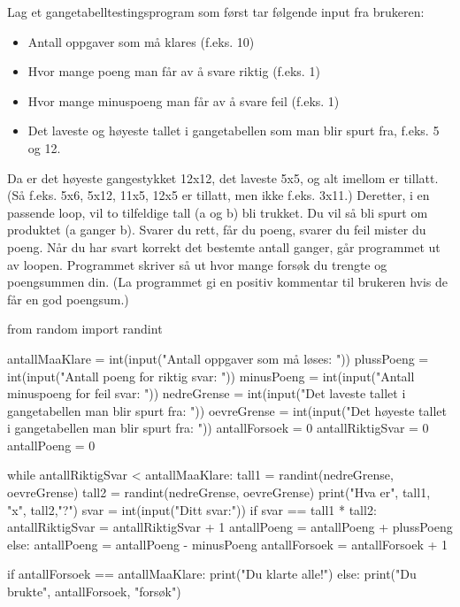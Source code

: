 \begin{exercise}
Lag et gangetabelltestingsprogram som først tar følgende input fra brukeren:
\begin{itemize}
\item Antall oppgaver som må klares (f.eks. 10)
\item Hvor mange poeng man får av å svare riktig (f.eks. 1)
\item Hvor mange minuspoeng man får av å svare feil (f.eks. 1)
\item Det laveste og høyeste tallet i gangetabellen som man blir spurt fra, f.eks. 5 og 12.
\end{itemize}
Da er det høyeste gangestykket 12x12, det laveste 5x5, og alt imellom er tillatt. (Så f.eks. 5x6, 5x12, 11x5, 12x5 er tillatt, men ikke f.eks. 3x11.) Deretter, i en passende loop, vil to tilfeldige tall (a og b) bli trukket. Du vil så bli spurt om produktet (a ganger b). Svarer du rett, får du poeng, svarer du feil mister du poeng. Når du har svart korrekt det bestemte antall ganger, går programmet ut av loopen. Programmet skriver så ut hvor mange forsøk du trengte og poengsummen din. (La programmet gi en positiv kommentar til brukeren hvis de får en god poengsum.) 
\end{exercise}
\begin{solution}
\begin{usncodebox}
from random import randint

antallMaaKlare = int(input("Antall oppgaver som må løses: "))
plussPoeng = int(input("Antall poeng for riktig svar: "))
minusPoeng = int(input("Antall minuspoeng for feil svar: "))
nedreGrense = int(input("Det laveste tallet i gangetabellen man blir spurt fra: "))
oevreGrense = int(input("Det høyeste tallet i gangetabellen man blir spurt fra: "))
antallForsoek = 0
antallRiktigSvar = 0
antallPoeng = 0

while antallRiktigSvar < antallMaaKlare:
    tall1 = randint(nedreGrense, oevreGrense)
    tall2 = randint(nedreGrense, oevreGrense)
    print("Hva er", tall1, "x", tall2,"?")
    svar = int(input("Ditt svar:"))
    if svar == tall1 * tall2:
        antallRiktigSvar = antallRiktigSvar + 1
        antallPoeng = antallPoeng + plussPoeng
    else:
        antallPoeng = antallPoeng - minusPoeng
    antallForsoek = antallForsoek + 1
    
if antallForsoek == antallMaaKlare:
    print("Du klarte alle!")
else:
    print("Du brukte", antallForsoek, "forsøk")
\end{usncodebox}
\end{solution}

